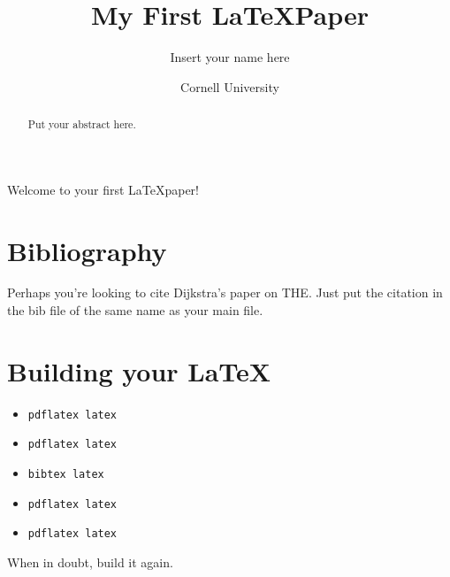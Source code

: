 \documentclass[twocolumn]{article}
\title{My First \LaTeX Paper}
\author{Insert your name here}
\date{Cornell University}
\begin{document}
\maketitle

\begin{abstract}
Put your abstract here.
\end{abstract}

Welcome to your first \LaTeX paper!

\section{Bibliography}

Perhaps you're looking to cite Dijkstra's paper on
THE\cite{DBLP:journals/cacm/Dijkstra68}.  Just put the citation in the bib file
of the same name as your main file.

\section{Building your \LaTeX}

\begin{itemize}
\item \texttt{pdflatex latex}
\item \texttt{pdflatex latex}
\item \texttt{bibtex latex}
\item \texttt{pdflatex latex}
\item \texttt{pdflatex latex}
\end{itemize}

When in doubt, build it again.

{}

\end{document}

